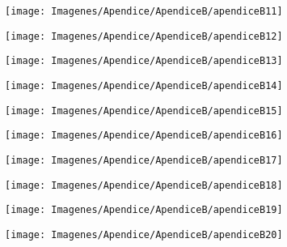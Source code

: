 \begin{figure}[h]
  \centering
\texttt{[image: Imagenes/Apendice/ApendiceB/apendiceB11]}
\end{figure}

\begin{figure}[h]
  \centering
\texttt{[image: Imagenes/Apendice/ApendiceB/apendiceB12]}
\end{figure}

\begin{figure}[h]
  \centering
\texttt{[image: Imagenes/Apendice/ApendiceB/apendiceB13]}
\end{figure}

\begin{figure}[h]
  \centering
\texttt{[image: Imagenes/Apendice/ApendiceB/apendiceB14]}
\end{figure}

\begin{figure}[h]
  \centering
\texttt{[image: Imagenes/Apendice/ApendiceB/apendiceB15]}
\end{figure}

\begin{figure}[h]
  \centering
\texttt{[image: Imagenes/Apendice/ApendiceB/apendiceB16]}
\end{figure}

\begin{figure}[h]
  \centering
\texttt{[image: Imagenes/Apendice/ApendiceB/apendiceB17]}
\end{figure}

\begin{figure}[h]
  \centering
\texttt{[image: Imagenes/Apendice/ApendiceB/apendiceB18]}
\end{figure}

\begin{figure}[h]
  \centering
\texttt{[image: Imagenes/Apendice/ApendiceB/apendiceB19]}
\end{figure}

\begin{figure}[h]
  \centering
\texttt{[image: Imagenes/Apendice/ApendiceB/apendiceB20]}
\end{figure}
